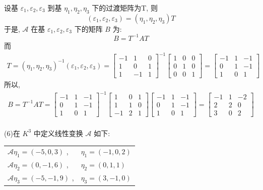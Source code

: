 \documentclass[11pt,a4paper,openany,oneside]{book}
\begin{document}
设基 $ \varepsilon_1, \varepsilon_2, \varepsilon_3 $ 到基 $ \eta_1, \eta_2, \eta_3 $ 下的过渡矩阵为T, 则
 $$  (\varepsilon_1, \varepsilon_2, \varepsilon_3)   = (\eta_1, \eta_2, \eta_3) T $$ 
于是,  $ \mathcal{A} $ 在基 $ \varepsilon_1, \varepsilon_2, \varepsilon_3 $ 下的矩阵 $ B $ 为:
 $$  B = T^{-1}AT  $$ 
而
\begin{gather*}
T = (\eta_1, \eta_2, \eta_3)^{-1}(\varepsilon_1, \varepsilon_2, \varepsilon_3)=
\begin{bmatrix}
-1  &  1  &  0  \\
1  &  0  &  1  \\
1  &  -1  &  1  
\end{bmatrix}^{-1}
\begin{bmatrix}
1  &  0  &  0  \\
0  &  1  &  0  \\
0  &  0  &  1
\end{bmatrix}=
\begin{bmatrix}
-1   &  1 &  -1   \\
0  &   1 &   -1  \\
1  &   0   &  1
\end{bmatrix}
\end{gather*}
所以,
\begin{gather*}
B = T^{-1}AT=
\begin{bmatrix}
-1   &  1 &  -1   \\
0  &   1 &   -1  \\
1  &   0   &  1
\end{bmatrix}^{-1}
\begin{bmatrix}
1  &  0  &  1  \\
1  &  1  &  0  \\
-1  &  2  &  1  
\end{bmatrix}
\begin{bmatrix}
-1   &  1 &  -1   \\
0  &   1 &   -1  \\
1  &   0   &  1
\end{bmatrix}=
\begin{bmatrix}
-1   &  1  &  -2  \\
2  &  2  &   0  \\
3  &  0 &    2
\end{bmatrix}
\end{gather*}  \\ 


(6)在 $ K^3 $ 中定义线性变换 $ \mathcal{A} $ 如下:
\begin{center}
	\begin{tabular}{ll}
		 $ \mathcal{A}\eta_1 = (-5, 0, 3) $ , &  $ \eta_1=(-1, 0, 2) $  \\
		 $ \mathcal{A}\eta_2 = (0, -1, 6) $ , &  $ \eta_2=(0, 1, 1) $  \\
		 $ \mathcal{A}\eta_3 = (-5, -1, 9) $ , &  $ \eta_3=(3, -1, 0) $  \\
	\end{tabular}
\end{center}
\end{document}
